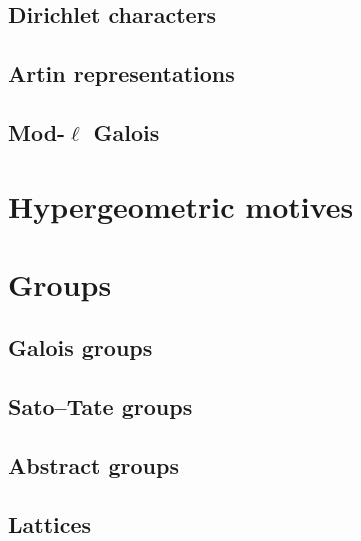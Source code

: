 \section{Dirichlet characters}


\section{Artin representations}


\section{Mod-$\ell$ Galois}


\chapter{Hypergeometric motives}


\chapter{Groups}

\section{Galois groups}


\section{Sato--Tate groups}


\section{Abstract groups}


\section{Lattices}

